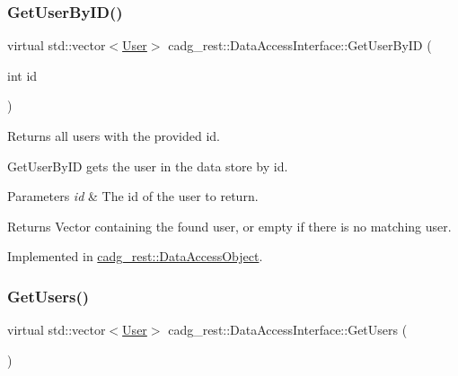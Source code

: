 \subsubsection{\texorpdfstring{GetUserByID()}{GetUserByID()}}
{\footnotesize\ttfamily virtual std\+::vector$<$\mbox{\hyperlink{structcadg__rest_1_1_user}{User}}$>$ cadg\+\_\+rest\+::\+Data\+Access\+Interface\+::\+Get\+User\+By\+ID (\begin{DoxyParamCaption}\item[{int}]{id }\end{DoxyParamCaption})\hspace{0.3cm}{\ttfamily [pure virtual]}}



Returns all users with the provided id. 

Get\+User\+By\+ID gets the user in the data store by id.


\begin{DoxyParams}{Parameters}
{\em id} & The id of the user to return. \\
\hline
\end{DoxyParams}
\begin{DoxyReturn}{Returns}
Vector containing the found user, or empty if there is no matching user. 
\end{DoxyReturn}


Implemented in \mbox{\hyperlink{classcadg__rest_1_1_data_access_object_a54d23c50e3be7d80503f43e7ff82752e}{cadg\+\_\+rest\+::\+Data\+Access\+Object}}.

\mbox{\label{classcadg__rest_1_1_data_access_interface_a657bd814589e6c5553a0303115350783}} 
\subsubsection{\texorpdfstring{GetUsers()}{GetUsers()}}
{\footnotesize\ttfamily virtual std\+::vector$<$\mbox{\hyperlink{structcadg__rest_1_1_user}{User}}$>$ cadg\+\_\+rest\+::\+Data\+Access\+Interface\+::\+Get\+Users (\begin{DoxyParamCaption}{ }\end{DoxyParamCaption})\hspace{0.3cm}{\ttfamily [pure virtual]}}



